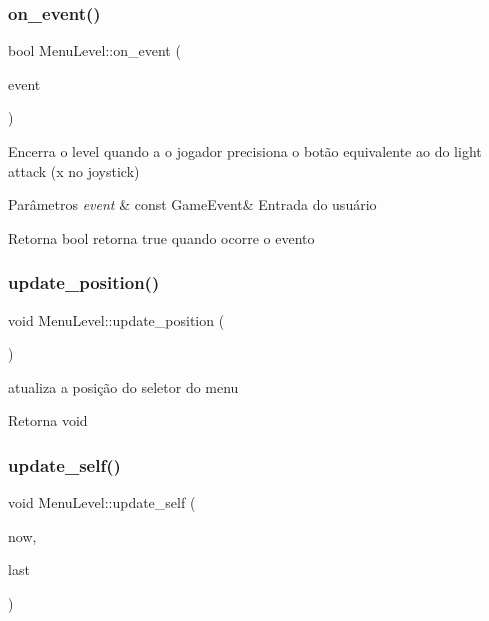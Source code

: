 \subsubsection{\texorpdfstring{on\+\_\+event()}{on\_event()}}
{\footnotesize\ttfamily bool Menu\+Level\+::on\+\_\+event (\begin{DoxyParamCaption}\item[{const Game\+Event \&}]{event }\end{DoxyParamCaption})\hspace{0.3cm}{\ttfamily [protected]}}



Encerra o level quando a o jogador precisiona o botão equivalente ao do light attack (x no joystick) 


\begin{DoxyParams}{Parâmetros}
{\em event} & const Game\+Event\& Entrada do usuário \\
\hline
\end{DoxyParams}
\begin{DoxyReturn}{Retorna}
bool retorna true quando ocorre o evento 
\end{DoxyReturn}
\mbox{\label{classMenuLevel_abdc07d5fc61e4767f81c56b1198e848e}} 
\subsubsection{\texorpdfstring{update\+\_\+position()}{update\_position()}}
{\footnotesize\ttfamily void Menu\+Level\+::update\+\_\+position (\begin{DoxyParamCaption}{ }\end{DoxyParamCaption})\hspace{0.3cm}{\ttfamily [protected]}}



atualiza a posição do seletor do menu 

\begin{DoxyReturn}{Retorna}
void 
\end{DoxyReturn}
\mbox{\label{classMenuLevel_ab84aecb253d1d83b827be0eaf08a3e22}} 
\subsubsection{\texorpdfstring{update\+\_\+self()}{update\_self()}}
{\footnotesize\ttfamily void Menu\+Level\+::update\+\_\+self (\begin{DoxyParamCaption}\item[{unsigned}]{now,  }\item[{unsigned}]{last }\end{DoxyParamCaption})\hspace{0.3cm}{\ttfamily [protected]}}



